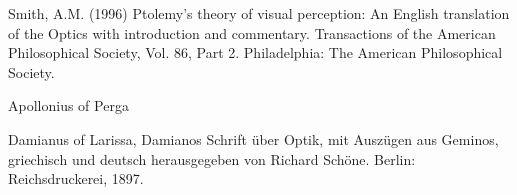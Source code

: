 Smith, A.M. (1996) Ptolemy's theory of visual perception: An English translation of the Optics with introduction and commentary. Transactions of the American Philosophical Society, Vol. 86, Part 2. Philadelphia: The American Philosophical Society.

Apollonius of Perga

Damianus of Larissa, Damianos Schrift \"uber Optik, mit Ausz\"ugen aus Geminos, griechisch und deutsch herausgegeben von Richard Sch\"one. Berlin: Reichsdruckerei, 1897.